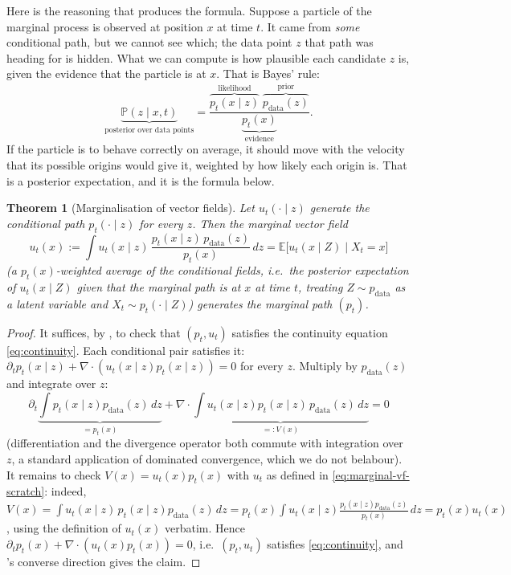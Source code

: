 \documentclass[11pt,a4paper]{report}
\newtheorem{theorem}{Theorem}[chapter]
\theoremstyle{definition}
\theoremstyle{remark}
\newcommand{\EE}{\mathbb E}
\newcommand{\PP}{\mathbb P}
\begin{document}
Here is the reasoning that produces the formula. Suppose a particle of the
marginal process is observed at position $x$ at time $t$. It came from
\emph{some} conditional path, but we cannot see which; the data point $z$
that path was heading for is hidden. What we can compute is how plausible
each candidate $z$ is, given the evidence that the particle is at $x$. That
is Bayes' rule:
\begin{equation}
\label{eq:cfm-posterior}
\underbrace{\PP(z\mid x,t)}_{\text{posterior over data points}}
=
\frac{\overbrace{p_t(x\mid z)}^{\text{likelihood}}\;\overbrace{p_{\mathrm{data}}(z)}^{\text{prior}}}
     {\underbrace{p_t(x)}_{\text{evidence}}} .
\end{equation}
If the particle is to behave correctly on average, it should move with the
velocity that its possible origins would give it, weighted by how likely
each origin is. That is a posterior expectation, and it is the formula
below.

\begin{theorem}[Marginalisation of vector fields]
\label{thm:marginalisation-vf-scratch}
Let $u_t(\cdot\mid z)$ generate the conditional path $p_t(\cdot\mid z)$ for
every $z$. Then the marginal vector field
\begin{equation}
\label{eq:marginal-vf-scratch}
u_t(x) := \int u_t(x\mid z)\,\frac{p_t(x\mid z)\,p_{\mathrm{data}}(z)}{p_t(x)}\,dz
= \EE\bigl[u_t(x\mid Z)\mid X_t=x\bigr]
\end{equation}
(a $p_t(x)$-weighted average of the conditional fields, i.e.\ the
posterior expectation of $u_t(x\mid Z)$ given that the marginal path is at
$x$ at time $t$, treating $Z\sim p_{\mathrm{data}}$ as a latent variable and
$X_t\sim p_t(\cdot\mid Z)$) generates the marginal path $(p_t)$.
\end{theorem}

\begin{proof}
It suffices, by , to check that $(p_t,u_t)$ satisfies
the continuity equation \eqref{eq:continuity}. Each conditional pair
satisfies it: $\partial_tp_t(x\mid z) + \nabla\cdot(u_t(x\mid z)p_t(x\mid z)) = 0$
for every $z$. Multiply by $p_{\mathrm{data}}(z)$ and integrate over $z$:
\[
\partial_t\underbrace{\int p_t(x\mid z)p_{\mathrm{data}}(z)\,dz}_{=p_t(x)}
+
\nabla\cdot\underbrace{\int u_t(x\mid z)p_t(x\mid z)\,p_{\mathrm{data}}(z)\,dz}_{=:V(x)}
=0
\]
(differentiation and the divergence operator both commute with integration
over $z$, a standard application of dominated convergence, which we do not
belabour). It remains to check $V(x)=u_t(x)p_t(x)$ with $u_t$ as defined in
\eqref{eq:marginal-vf-scratch}: indeed,
$V(x) = \int u_t(x\mid z)\,p_t(x\mid z)p_{\mathrm{data}}(z)\,dz = p_t(x)\int u_t(x\mid z)\frac{p_t(x\mid z)p_{\mathrm{data}}(z)}{p_t(x)}\,dz = p_t(x)u_t(x)$,
using the definition of $u_t(x)$ verbatim. Hence
$\partial_tp_t(x)+\nabla\cdot(u_t(x)p_t(x))=0$, i.e.\ $(p_t,u_t)$ satisfies
\eqref{eq:continuity}, and 's converse direction gives
the claim.
\end{proof}
\end{document}
